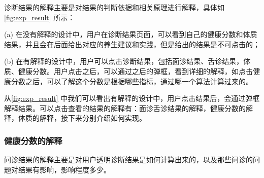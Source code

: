 诊断结果的解释主要是对结果的判断依据和相关原理进行解释，具体如 \ref{fig:exp_result} 所示：

(a) 在没有解释的设计中，用户在诊断结果页面，可以看到自己的健康分数和体质结果，并且会在后面给出对应的养生建议和实践，但是给出的结果是不可点击的；

(b) 在有解释的设计中，用户可以点击诊断结果，包括面诊结果、舌诊结果，体质、健康分数。用户点击之后，可以通过之后的弹框，看到详细的解释，如点击健康分数之后，可以了解这个分数是根据哪些指标，通过哪一个算法计算过来的。

从\ref{fig:exp_result} 中我们可以看出有解释的设计中，用户点击结果后，会通过弹框解释结果。可以点击查看的结果的解释有：面诊舌诊结果的解释，健康分数的解释，体质的解释，接下来分别介绍如何实现。



\subsubsection{健康分数的解释}
问诊结果的解释主要是对用户透明诊断结果是如何计算出来的，以及那些问诊的问题对结果有影响，影响程度多少。

